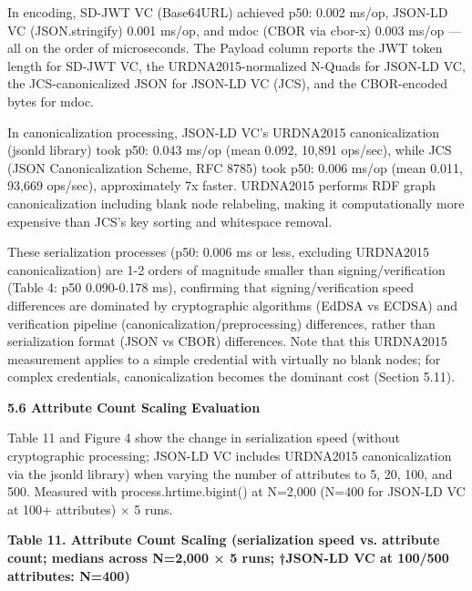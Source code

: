 In encoding, SD-JWT VC (Base64URL) achieved p50: 0.002 ms/op, JSON-LD VC (JSON.stringify) 0.001 ms/op, and mdoc (CBOR via cbor-x) 0.003 ms/op --- all on the order of microseconds. The Payload column reports the JWT token length for SD-JWT VC, the URDNA2015-normalized N-Quads for JSON-LD VC, the JCS-canonicalized JSON for JSON-LD VC (JCS), and the CBOR-encoded bytes for mdoc.

In canonicalization processing, JSON-LD VC's URDNA2015 canonicalization (jsonld library) took p50: 0.043 ms/op (mean 0.092, 10,891 ops/sec), while JCS (JSON Canonicalization Scheme, RFC 8785) took p50: 0.006 ms/op (mean 0.011, 93,669 ops/sec), approximately 7x faster. URDNA2015 performs RDF graph canonicalization including blank node relabeling, making it computationally more expensive than JCS's key sorting and whitespace removal.

These serialization processes (p50: 0.006 ms or less, excluding URDNA2015 canonicalization) are 1-2 orders of magnitude smaller than signing/verification (Table 4: p50 0.090-0.178 ms), confirming that signing/verification speed differences are dominated by cryptographic algorithms (EdDSA vs ECDSA) and verification pipeline (canonicalization/preprocessing) differences, rather than serialization format (JSON vs CBOR) differences. Note that this URDNA2015 measurement applies to a simple credential with virtually no blank nodes; for complex credentials, canonicalization becomes the dominant cost (Section 5.11).

\textbf{5.6 Attribute Count Scaling Evaluation}

Table 11 and Figure 4 show the change in serialization speed (without cryptographic processing; JSON-LD VC includes URDNA2015 canonicalization via the jsonld library) when varying the number of attributes to 5, 20, 100, and 500. Measured with process.hrtime.bigint() at N=2,000 (N=400 for JSON-LD VC at 100+ attributes) × 5 runs.

\textbf{Table 11. Attribute Count Scaling (serialization speed vs. attribute count; medians across N=2,000 × 5 runs; †JSON-LD VC at 100/500 attributes: N=400)}

